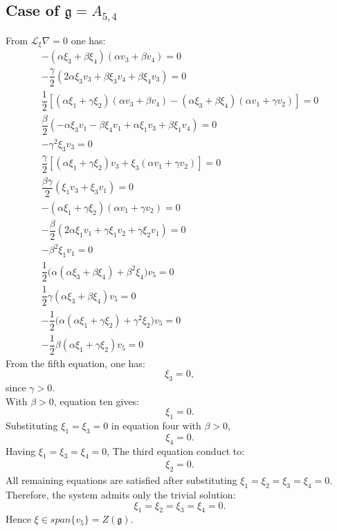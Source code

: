 \documentclass[10pt]{article}
\begin{document}
\subsection{Case of $\mathfrak{g}=A_{5,4}$}
From $\mathscr{L}_\xi\nabla =0$ one has: \begin{eqnarray} 
     -(\alpha\xi_3 + \beta\xi_4)(\alpha v_3 + \beta v_4)=0 \\
 -\dfrac{\gamma}{2} \left( 2\alpha\xi_3 v_3 + \beta\xi_3 v_4 + \beta\xi_4 v_3 \right)=0 \\
\dfrac{1}{2} \left[ (\alpha\xi_1 + \gamma\xi_2)(\alpha v_3 + \beta v_4) - (\alpha\xi_3 + \beta\xi_4)(\alpha v_1 + \gamma v_2) \right]=0 \\
 \dfrac{\beta}{2} \left( -\alpha\xi_3 v_1 - \beta\xi_4 v_1 + \alpha\xi_1 v_3 + \beta\xi_1 v_4 \right)=0 \\
 -\gamma^2 \xi_3 v_3=0 \\
\dfrac{\gamma}{2} \left[ (\alpha\xi_1 + \gamma\xi_2) v_3 + \xi_3 (\alpha v_1 + \gamma v_2) \right]=0 \\
 \dfrac{\beta\gamma}{2} \left( \xi_1 v_3 + \xi_3 v_1 \right)=0 \\
 -(\alpha\xi_1 + \gamma\xi_2)(\alpha v_1 + \gamma v_2)=0 \\
-\dfrac{\beta}{2} \left( 2\alpha\xi_1 v_1 + \gamma\xi_1 v_2 + \gamma\xi_2 v_1 \right)=0 \\
 -\beta^2 \xi_1 v_1=0\\
  \dfrac{1}{2} \Big(\alpha(\alpha\xi_3 + \beta\xi_4) + \beta^2\xi_4\Big)v_5=0 \\
  \dfrac{1}{2} \gamma(\alpha\xi_3 + \beta\xi_4)v_5=0 \\
   -\dfrac{1}{2} \Big(\alpha(\alpha\xi_1 + \gamma\xi_2) + \gamma^2\xi_2\Big)v_5=0 \\
 -\dfrac{1}{2} \beta(\alpha\xi_1 + \gamma\xi_2)v_5=0
\end{eqnarray} 
From the fifth equation, one has:
\begin{equation*}
 \xi_3 = 0,
\end{equation*}
since $\gamma > 0$.\\
With $\beta > 0$, equation ten gives:
\begin{equation*}
 \xi_1  = 0.
\end{equation*}
Substituting $\xi_1 = \xi_3 = 0$ in equation four with $\beta>0$, 
\begin{equation*}
\xi_4 = 0.
\end{equation*}
Having $\xi_1 = \xi_3 = \xi_4 = 0$, The third equation conduct to:
\begin{align*}
\xi_2= 0.
\end{align*}
All remaining equations are satisfied after substituting $\xi_1 = \xi_2 = \xi_3 = \xi_4 = 0$.
Therefore, the system admits only the trivial solution:
\begin{equation*}
\xi_1 = \xi_2 = \xi_3 = \xi_4 = 0.
\end{equation*}
Hence $\xi\in span\{v_5\}=Z(\mathfrak{g})$.
\end{document}
